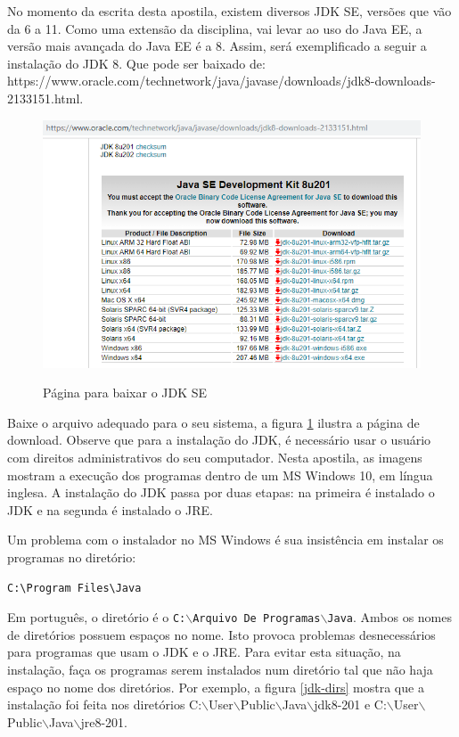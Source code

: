 \documentclass[
	12pt,				%
	openright,			%
	twoside,			%
	a4paper,			%
	english,			%
	french,				%
	spanish,			%
	brazil				%
	]{abntex2}
\begin{document}
No momento da escrita desta apostila, existem diversos JDK SE, versões que vão da 6 a 11. Como uma extensão da disciplina, vai levar ao uso do Java EE, a versão mais avançada do Java EE é a 8. Assim, será exemplificado a seguir a instalação do JDK 8. Que pode ser baixado de:
https://www.oracle.com/technetwork/java/javase/downloads/jdk8-downloads-2133151.html.

\begin{figure}[h]
\begin{center}
\includegraphics[scale=0.5]{jdk-download.png} 
\caption{Página para baixar o JDK SE}
\label{fig:jdk-download}
\end{center}
\end{figure}

Baixe o arquivo adequado para o seu sistema, a figura \ref{fig:jdk-download} ilustra a página de download. Observe que para a instalação do JDK, é necessário usar o usuário com direitos administrativos do seu computador. Nesta apostila, as imagens mostram a execução dos programas dentro de um MS Windows 10, em língua inglesa. A instalação do JDK passa por duas etapas: na primeira é instalado o JDK e na segunda é instalado o JRE.

Um problema com o instalador no MS Windows é sua insistência em instalar os programas no diretório:
\begin{verbatim}
C:\Program Files\Java
\end{verbatim}

Em português, o diretório é o \texttt{C:$\backslash$Arquivo De Programas$\backslash$Java}. Ambos os nomes de diretórios possuem espaços no nome. Isto provoca problemas desnecessários para programas que usam o JDK e o JRE. Para evitar esta situação, na instalação, faça os programas serem instalados num diretório tal que não haja espaço no nome dos diretórios. Por exemplo, a figura \ref{jdk-dirs} mostra que a instalação foi feita nos diretórios C:$\backslash$User$\backslash$Public$\backslash$Java$\backslash$jdk8-201 e C:$\backslash$User$\backslash$Public$\backslash$Java$\backslash$jre8-201.
\end{document}
